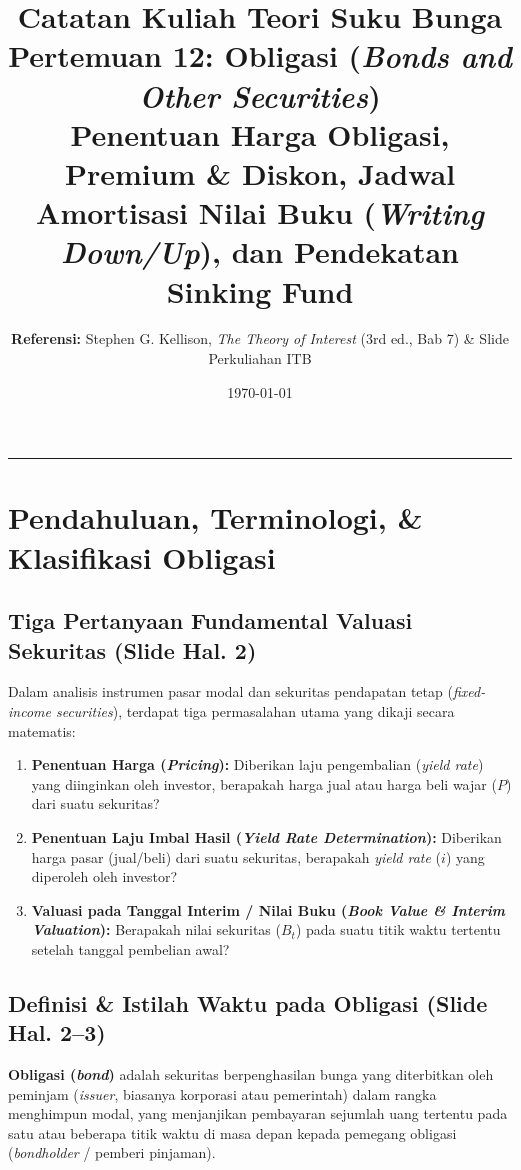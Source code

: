 \documentclass[11pt,a4paper]{article}
\title{\textbf{\LARGE Catatan Kuliah Teori Suku Bunga}\\[0.3em]
\Large Pertemuan 12: Obligasi (\textit{Bonds and Other Securities})\\[0.2em]
\large Penentuan Harga Obligasi, Premium \& Diskon, Jadwal Amortisasi Nilai Buku (\textit{Writing Down/Up}), dan Pendekatan Sinking Fund}
\author{\textbf{Referensi:} Stephen G. Kellison, \textit{The Theory of Interest} (3rd ed., Bab 7) \& Slide Perkuliahan ITB}
\date{\today}
\begin{document}
\maketitle
\tableofcontents
\vspace{1em}
\noindent\rule{\textwidth}{0.4pt}
\vspace{1.5em}

\section{Pendahuluan, Terminologi, \& Klasifikasi Obligasi}

\subsection{Tiga Pertanyaan Fundamental Valuasi Sekuritas (Slide Hal. 2)}

Dalam analisis instrumen pasar modal dan sekuritas pendapatan tetap (\textit{fixed-income securities}), terdapat tiga permasalahan utama yang dikaji secara matematis:

\begin{notebox}
\begin{enumerate}[label=\textbf{\arabic*.}]
    \item \textbf{Penentuan Harga (\textit{Pricing}):} Diberikan laju pengembalian (\textit{yield rate}) yang diinginkan oleh investor, berapakah harga jual atau harga beli wajar ($P$) dari suatu sekuritas?
    \item \textbf{Penentuan Laju Imbal Hasil (\textit{Yield Rate Determination}):} Diberikan harga pasar (jual/beli) dari suatu sekuritas, berapakah \textit{yield rate} ($i$) yang diperoleh oleh investor?
    \item \textbf{Valuasi pada Tanggal Interim / Nilai Buku (\textit{Book Value \& Interim Valuation}):} Berapakah nilai sekuritas ($B_t$) pada suatu titik waktu tertentu setelah tanggal pembelian awal?
\end{enumerate}
\end{notebox}

\subsection{Definisi \& Istilah Waktu pada Obligasi (Slide Hal. 2--3)}

\begin{definitionbox}
\textbf{Obligasi (\textit{bond})} adalah sekuritas berpenghasilan bunga yang diterbitkan oleh peminjam (\textit{issuer}, biasanya korporasi atau pemerintah) dalam rangka menghimpun modal, yang menjanjikan pembayaran sejumlah uang tertentu pada satu atau beberapa titik waktu di masa depan kepada pemegang obligasi (\textit{bondholder} / pemberi pinjaman).
\end{definitionbox}
\end{document}

